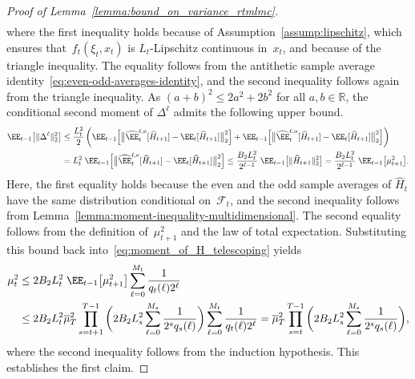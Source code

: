 \documentclass[11pt]{article}
\let\hat\widehat
\begin{document}
\begin{proof}[Proof of Lemma~\ref{lemma:bound_on_variance_rtmlmc}]
\begin{align*}
\end{align*}
where the first inequality holds because of Assumption~\ref{assump:lipschitz}, which ensures that~$f_t(\xi_t,x_t)$ is $L_t$-Lipschitz continuous in~$x_t$, and because of the triangle inequality. The equality follows from the antithetic sample average identity~\eqref{eq:even-odd-averages-identity}, and the second inequality follows again from the triangle inequality. As $(a+b)^2\leq 2a^2+2b^2$ for all $a,b\in\mathbb R$, the conditional second moment of $\Delta^\ell$ admits the following upper bound.
\begin{align*}
    \EE_{t-1}\big[\|\Delta^\ell\|_2^2\big] & \leq \frac{L_t^2}{2} \left(\EE_{t-1}\Big[ \big\| \hat \EE_t^{\ell, {\rm e}}[\hat{H}_{t+1}] -\EE_{t}[\hat{H}_{t+1}] \big\|_2^2 \Big]
    + \EE_{t-1} \Big[ \big\|\hat \EE_t^{\ell,{\rm o}}[\hat{H}_{t+1}] -
    \EE_{t}[\hat{H}_{t+1}] \big\|_2^2 \Big] \right)\\
    & = L_t^2 \;\EE_{t-1}\Big[\big\|\hat \EE_t^{\ell, {\rm e}}[\hat{H}_{t+1}] -\EE_{t}[\hat{H}_{t+1}] \big\|_2^2 \Big] \leq \frac{B_2 L_t^2}{2^{\ell-1}} \; \EE_{t-1}\big[\|\hat{H}_{t+1}\|_2^2\big] =\frac{B_2 L_t^2}{2^{\ell-1}} \; \EE_{t-1}\big[\mu_{t+1}^2\big].
\end{align*}
Here, the first equality holds because the even and the odd sample averages of $\hat H_t$ have the same distribution conditional on~$\mathcal F_{t}$, and the second inequality follows from Lemma~\ref{lemma:moment-inequality-multidimensional}. The second equality follows from the definition of~$\mu_{t+1}^2$ and the law of total expectation. Substituting this bound back into~\eqref{eq:moment_of_H_telescoping} yields
\begin{align*}
    \mu_t^2 &\leq 2B_2L_t^2 \; \EE_{t-1}\big[ \mu_{t+1}^2 \big]\sum_{\ell=0}^{M_{t}}\frac{1}{q_t(\ell) 2^{
    \ell}}  \\
    &\leq 2B_2L_t^2 \overline\mu_T^2 \prod_{s=t+1}^{T-1}\bigg(2B_2L^2_s\sum_{\ell=0}^{M_s}\frac{1}{2^s q_s(\ell)} \bigg) \sum_{\ell=0}^{M_{t}}\frac{1}{q_t(\ell)2^{\ell} } = \overline\mu_T^2 \prod_{s=t}^{T-1}\bigg(2B_2 L_s^2 \sum_{\ell=0}^{M_s}\frac{1}{2^s q_s(\ell)} \bigg),
\end{align*}
where the second inequality follows from the induction hypothesis. This establishes the first claim.



\end{proof}
\end{document}
